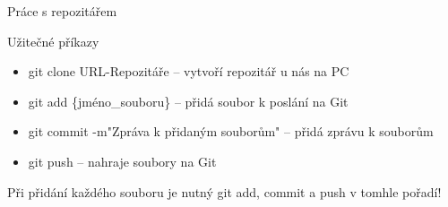 \documentclass{beamer}
\begin{document}
\begin{frame}[t]{Práce s repozitářem}

\begin{block}{Užitečné příkazy}

\begin{itemize}

	\item git clone URL-Repozitáře -- vytvoří repozitář u nás na PC
	
	\item git add \{jméno\_souboru\} -- přidá soubor k poslání na Git
	
	\item git commit -m"Zpráva k přidaným souborům" -- přidá zprávu k souborům
	
	\item git push -- nahraje soubory na Git


\end{itemize}
\end{block}

\pause 

Při přidání každého souboru je nutný git add, commit a push v tomhle pořadí!


\end{frame}
\end{document}
